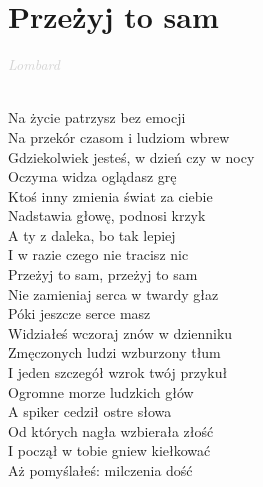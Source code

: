 \documentclass[a5paper, 10pt]{book}
\begin{document}
\section{Przeżyj to sam}\textcolor{lightgray}{\textit{Lombard}}\\~\\
\begin{minipage}[t]{0.75\textwidth}
  Na życie patrzysz bez emocji\\
  Na przekór czasom i ludziom wbrew\\
  Gdziekolwiek jesteś, w dzień czy w nocy\\
  Oczyma widza oglądasz grę\\
  Ktoś inny zmienia świat za ciebie\\
  Nadstawia głowę, podnosi krzyk\\
  A ty z daleka, bo tak lepiej\\
  I w razie czego nie tracisz nic\\

  \hspace*{5mm}Przeżyj to sam, przeżyj to sam\\
  \hspace*{5mm}Nie zamieniaj serca w twardy głaz\\
  \hspace*{5mm}Póki jeszcze serce masz\\

  Widziałeś wczoraj znów w dzienniku\\
  Zmęczonych ludzi wzburzony tłum\\
  I jeden szczegół wzrok twój przykuł\\
  Ogromne morze ludzkich głów\\
  A spiker cedził ostre słowa\\
  Od których nagła wzbierała złość\\
  I począł w tobie gniew kiełkować\\
  Aż pomyślałeś: milczenia dość\\
\end{minipage}
\end{document}
